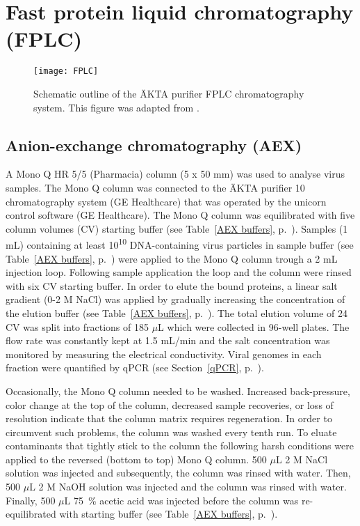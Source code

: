 \section{Fast protein liquid chromatography (FPLC)}

\begin{figure}[H]
\centering
  \texttt{[image: FPLC]}
  \caption[Schematic outline of the ÄKTA purifier FPLC chromatography system.]
   {Schematic outline of the ÄKTA purifier FPLC chromatography system. This figure was adapted from \cite{pmid20978981}.} 
\label{FPLC}
\end{figure}


\subsection{Anion-exchange chromatography (AEX)}
\label{AEX}
A Mono Q\textsuperscript{\texttrademark} HR 5/5 (Pharmacia) column (5 x 50 mm) was used to analyse virus samples. The Mono Q column was connected to the ÄKTA purifier 10 chromatography system (GE Healthcare) that was operated by the unicorn control software (GE Healthcare). The Mono Q\textsuperscript{\texttrademark} column was equilibrated with five column volumes (CV) starting buffer (see Table~\ref{AEX buffers}, p.~\pageref{AEX buffers}). Samples (1 mL) containing at least 10\textsuperscript{10} DNA-containing virus particles in sample buffer (see Table~\ref{AEX buffers}, p.~\pageref{AEX buffers}) were applied to the Mono Q\textsuperscript{\texttrademark} column trough a 2 mL injection loop. Following sample application the loop and the column were rinsed with six CV starting buffer. In order to elute the bound proteins, a linear salt gradient (0-2 M NaCl) was applied by gradually increasing the concentration of the elution buffer (see Table~\ref{AEX buffers}, p.~\pageref{AEX buffers}). The total elution volume of 24 CV was split into fractions of 185 $\mu$L which were collected in 96-well plates. The flow rate was constantly kept at 1.5 mL/min and the salt concentration was monitored by measuring the electrical conductivity. Viral genomes in each fraction were quantified by qPCR (see Section~\ref{qPCR}, p.~\pageref{qPCR}).  

Occasionally, the Mono Q\textsuperscript{\texttrademark} column needed to be washed. Increased back-pressure, color change at the top of the column, decreased sample recoveries, or loss of resolution indicate that the column matrix requires regeneration. In order to circumvent such problems, the column was washed every tenth run. To eluate contaminants that tightly stick to the column the following harsh conditions were applied to the reversed (bottom to top) Mono Q\textsuperscript{\texttrademark} column. 500 $\mu$L 2 M NaCl solution was injected and subsequently, the column was rinsed with water. Then, 500 $\mu$L 2 M NaOH solution was injected and the column was rinsed with water. Finally, 500 $\mu$L 75~\% acetic acid was injected before the column was re-equilibrated with starting buffer (see Table~\ref{AEX buffers}, p.~\pageref{AEX buffers}).             

